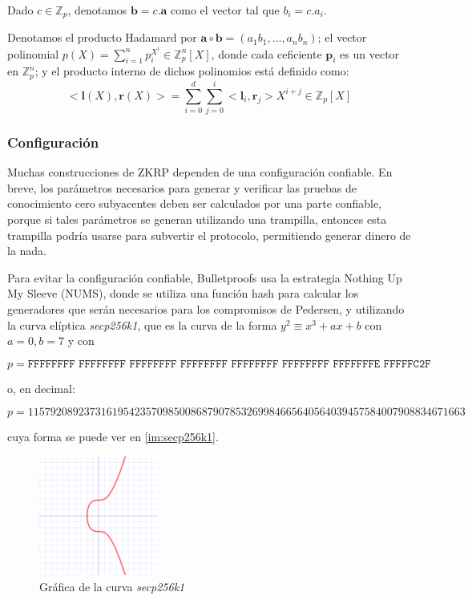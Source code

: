 Dado $c \in \mathbb{Z}_{p}$, denotamos $\mathbf{b} = c.\mathbf{a}$ como el vector tal que $b_{i} = c.a_{i}$.

Denotamos el producto Hadamard por $\mathbf{a} \circ \mathbf{b} = (a_{1}b_{1}, \dots, a_{n}b_{n})$; el vector polinomial $p(X) = \sum_{i=1}^{n} p_{i}^{X^{i}} \in \mathbb{Z}_{p}^{n}[X]$, donde cada ceficiente $\mathbf{p}_{i}$ es un vector en $\mathbb{Z}_{p}^{n}$; y el producto interno de dichos polinomios está definido como:
$$<\mathbf{l}(X), \mathbf{r}(X)> = \sum_{i=0}^{d} \sum_{j=0}^{i} <\mathbf{l}_{i}, \mathbf{r}_{j}>X^{i+j} \in \mathbb{Z}_{p}[X]$$

\subsubsection{Configuración}

Muchas construcciones de ZKRP dependen de una configuración confiable. En breve, los parámetros necesarios para generar y verificar las pruebas de conocimiento cero subyacentes deben ser calculados por una parte confiable, porque si tales parámetros se generan utilizando una trampilla, entonces esta trampilla podría usarse para subvertir el protocolo, permitiendo generar dinero de la nada.

Para evitar la configuración confiable, Bulletproofs usa la estrategia Nothing Up My Sleeve (NUMS), donde se utiliza una función hash para calcular los generadores que serán necesarios para los compromisos de Pedersen, y utilizando la curva elíptica \emph{secp256k1}, que es la curva de la forma $y^{2} \equiv x^{3} + ax + b$ con $a = 0, b = 7$ y con
\begin{small}
$$p = \texttt{FFFFFFFF FFFFFFFF FFFFFFFF FFFFFFFF FFFFFFFF FFFFFFFF FFFFFFFE FFFFFC2F}$$
\end{small}
o, en decimal:
\begin{small}
$$p = 115792089237316195423570985008687907853269984665640564039457584007908834671663$$
\end{small}
cuya forma se puede ver en \autoref{im:secp256k1}.
\begin{figure}[ht]
    \centering
    \includegraphics[width=0.35\textwidth]{images/Secp256k1.png}
    \caption{Gráfica de la curva \emph{secp256k1}}
    \label{im:secp256k1}
\end{figure}

